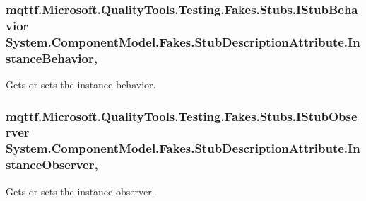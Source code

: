 \hypertarget{class_system_1_1_component_model_1_1_fakes_1_1_stub_description_attribute_a74b0f8f400a05f37652453964937d820}{
\subsubsection[{Instance\-Behavior}]{\setlength{\rightskip}{0pt plus 5cm}mqttf.\-Microsoft.\-Quality\-Tools.\-Testing.\-Fakes.\-Stubs.\-I\-Stub\-Behavior System.\-Component\-Model.\-Fakes.\-Stub\-Description\-Attribute.\-Instance\-Behavior\hspace{0.3cm}{\ttfamily [get]}, {\ttfamily [set]}}}\label{class_system_1_1_component_model_1_1_fakes_1_1_stub_description_attribute_a74b0f8f400a05f37652453964937d820}


Gets or sets the instance behavior.

\hypertarget{class_system_1_1_component_model_1_1_fakes_1_1_stub_description_attribute_aaedef38744597b27c040345c10ccccce}{
\subsubsection[{Instance\-Observer}]{\setlength{\rightskip}{0pt plus 5cm}mqttf.\-Microsoft.\-Quality\-Tools.\-Testing.\-Fakes.\-Stubs.\-I\-Stub\-Observer System.\-Component\-Model.\-Fakes.\-Stub\-Description\-Attribute.\-Instance\-Observer\hspace{0.3cm}{\ttfamily [get]}, {\ttfamily [set]}}}\label{class_system_1_1_component_model_1_1_fakes_1_1_stub_description_attribute_aaedef38744597b27c040345c10ccccce}


Gets or sets the instance observer.

